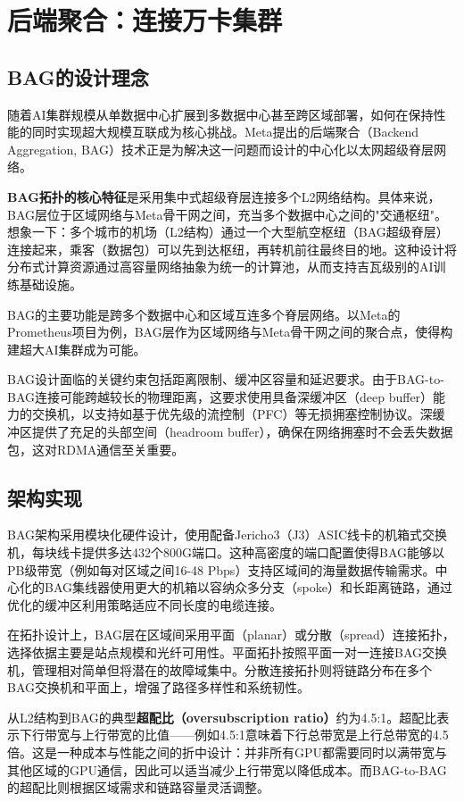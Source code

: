 \section{后端聚合：连接万卡集群}

\subsection{BAG的设计理念}

随着AI集群规模从单数据中心扩展到多数据中心甚至跨区域部署，如何在保持性能的同时实现超大规模互联成为核心挑战。Meta提出的后端聚合（Backend Aggregation, BAG）技术正是为解决这一问题而设计的中心化以太网超级脊层网络。

\textbf{BAG拓扑的核心特征}是采用集中式超级脊层连接多个L2网络结构。具体来说，BAG层位于区域网络与Meta骨干网之间，充当多个数据中心之间的"交通枢纽"。想象一下：多个城市的机场（L2结构）通过一个大型航空枢纽（BAG超级脊层）连接起来，乘客（数据包）可以先到达枢纽，再转机前往最终目的地。这种设计将分布式计算资源通过高容量网络抽象为统一的计算池，从而支持吉瓦级别的AI训练基础设施。

BAG的主要功能是跨多个数据中心和区域互连多个脊层网络。以Meta的Prometheus项目为例，BAG层作为区域网络与Meta骨干网之间的聚合点，使得构建超大AI集群成为可能。

BAG设计面临的关键约束包括距离限制、缓冲区容量和延迟要求。由于BAG-to-BAG连接可能跨越较长的物理距离，这要求使用具备深缓冲区（deep buffer）能力的交换机，以支持如基于优先级的流控制（PFC）等无损拥塞控制协议。深缓冲区提供了充足的头部空间（headroom buffer），确保在网络拥塞时不会丢失数据包，这对RDMA通信至关重要。

\subsection{架构实现}

BAG架构采用模块化硬件设计，使用配备Jericho3（J3）ASIC线卡的机箱式交换机，每块线卡提供多达432个800G端口。这种高密度的端口配置使得BAG能够以PB级带宽（例如每对区域之间16-48 Pbps）支持区域间的海量数据传输需求。中心化的BAG集线器使用更大的机箱以容纳众多分支（spoke）和长距离链路，通过优化的缓冲区利用策略适应不同长度的电缆连接。

在拓扑设计上，BAG层在区域间采用平面（planar）或分散（spread）连接拓扑，选择依据主要是站点规模和光纤可用性。平面拓扑按照平面一对一连接BAG交换机，管理相对简单但将潜在的故障域集中。分散连接拓扑则将链路分布在多个BAG交换机和平面上，增强了路径多样性和系统韧性。

从L2结构到BAG的典型\textbf{超配比（oversubscription ratio）}约为4.5:1。超配比表示下行带宽与上行带宽的比值——例如4.5:1意味着下行总带宽是上行总带宽的4.5倍。这是一种成本与性能之间的折中设计：并非所有GPU都需要同时以满带宽与其他区域的GPU通信，因此可以适当减少上行带宽以降低成本。而BAG-to-BAG的超配比则根据区域需求和链路容量灵活调整。

